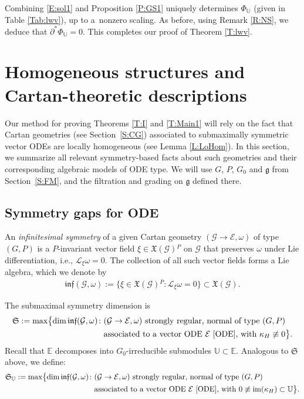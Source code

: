 \documentclass[pdftex]{sigma}%
\DeclareMathOperator{\img}{im}
\newcommand\cL{\mathcal{L}}
\newcommand{\g}{\mathfrak{g}}
\newcommand\cG{\mathcal{G}}
\newcommand\finf{\mathfrak{inf}}
\newcommand\fS{\mathfrak{S}}
\newcommand\fX {\mathfrak{X}}
\newcommand\bbE{\mathbb{E}}
\newcommand\bbU{\mathbb{U}}
\newcommand\cE{\mathcal{E}}
\numberwithin{equation}{section}
\begin{document}
 Combining \eqref{E:sol1} and Proposition \ref{P:GS1} uniquely determines $\Phi_{\bbU}$ (given in Table \ref{Tab:lwv}), up to a~nonzero scaling. As before, using Remark \ref{R:NS}, we deduce that $\partial^* \Phi_{\bbU} = 0$. This completes our proof of Theorem \ref{T:lwv}.

\section{Homogeneous structures and Cartan-theoretic descriptions} \label{S:Hom}

 Our method for proving Theorems \ref{T:I} and \ref{T:Main1} will rely on the fact that Cartan geometries (see Section~\ref{S:CG}) associated to submaximally symmetric vector ODEs are locally homogeneous (see Lemma \ref{L:LoHom}). In this section, we summarize all relevant symmetry-based facts about such geometries and their corresponding algebraic models of ODE type. We will use $G$, $P$, $G_0$ and $\g$ from Section~\ref{S:FM}, and the filtration and grading on $\g$ defined there.

\subsection{Symmetry gaps for ODE} \label{S:TPA}

An {\em infinitesimal symmetry} of a given Cartan geometry $(\cG \to \cE, \omega)$ of type $(G, P)$ is a $P$-invariant vector field $\xi \in \fX(\cG){}^P$ on $\cG$ that preserves $\omega$ under Lie differentiation, i.e., $\cL_\xi \omega = 0$. The collection of all such vector fields forms a Lie algebra, which we denote by
\begin{align*}
\finf(\cG, \omega) := \bigl\{\xi \in \fX(\cG){}^P\colon \cL_\xi \omega = 0\bigr\} \subset \fX(\cG).
\end{align*}

The submaximal symmetry dimension is
\begin{align*}%
\begin{split}
\fS := \max \bigl\{\dim \finf(\cG, \omega)\colon& (\cG \to \cE, \omega) \ \text{strongly regular, normal of type} \ (G,P) \\
& \text{associated to a vector ODE $\cE$ \eqref{ODE}, with} \ \kappa_H \not \equiv 0 \bigr \}.
\end{split}
\end{align*}
Recall that $\bbE$ decomposes into $G_0$-irreducible submodules $\bbU \subset \bbE$. Analogous to $\fS$ above, we define:
\begin{align*}
\begin{split}
\fS_\bbU := \max \bigl\{\dim \finf(\cG, \omega)\colon& (\cG \to \cE, \omega) \
 \text{strongly regular, normal of type}\ (G,P) \\
& \text{associated to a vector ODE $\cE$ \eqref{ODE},} \ \text{with} \ 0 \not \equiv \img(\kappa_H) \subset \bbU \bigr\}.
\end{split}
\end{align*}
\end{document}
